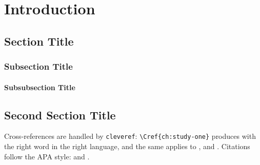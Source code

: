 
\chapter{Introduction}
\label{ch:introduction}
\blindtext

\section{Section Title}
\label{sec:introduction-01}

\blindtext

\subsection{Subsection Title}
\label{subsec:introduction-01}

\blindtext

\subsubsection{Subsubsection Title}

\blindtext

\section{Second Section Title}
\label{sec:introduction-02}

Cross-references are handled by \texttt{cleveref}: \verb|\Cref{ch:study-one}|
produces  with the right word in the right language, and
the same applies to ,  and
. Citations follow the APA style:
\parencite{sartori1970} and \textcite{lijphart1971}.

\blindtext

